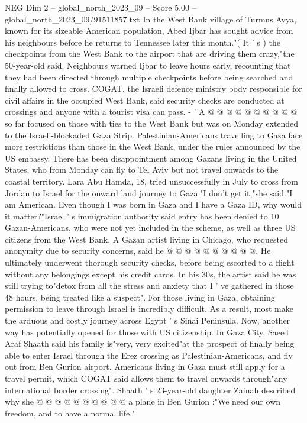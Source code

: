 \begin{textsample}{NEG Dim 2 – global\_north\_2023\_09 – Score 5.00 – global\_north\_2023\_09/91511857.txt}
In the West Bank village of Turmus Ayya, known for its sizeable American population, Abed Ijbar has sought advice from his neighbours before he returns to Tennessee later this month."( It ' s ) the checkpoints from the West Bank to the airport that are driving them crazy,"the 50-year-old said.
Neighbours warned Ijbar to leave hours early, recounting that they had been directed through multiple checkpoints before being searched and finally allowed to cross.
COGAT, the Israeli defence ministry body responsible for civil affairs in the occupied West Bank, said security checks are conducted at crossings and anyone with a tourist visa can pass. - ' A @ @ @ @ @ @ @ @ @ @ so far focused on those with ties to the West Bank but was on Monday extended to the Israeli-blockaded Gaza Strip.
Palestinian-Americans travelling to Gaza face more restrictions than those in the West Bank, under the rules announced by the US embassy.
There has been disappointment among Gazans living in the United States, who from Monday can fly to Tel Aviv but not travel onwards to the coastal territory.
Lara Abu Hamda, 18, tried unsuccessfully in July to cross from Jordan to Israel for the onward land journey to Gaza."I don't get it,"she said."I am American.
Even though I was born in Gaza and I have a Gaza ID, why would it matter?"Israel ' s immigration authority said entry has been denied to 10 Gazan-Americans, who were not yet included in the scheme, as well as three US citizens from the West Bank.
A Gazan artist living in Chicago, who requested anonymity due to security concerns, said he @ @ @ @ @ @ @ @ @ @.
He ultimately underwent thorough security checks, before being escorted to a flight without any belongings except his credit cards.
In his 30s, the artist said he was still trying to"detox from all the stress and anxiety that I ' ve gathered in those 48 hours, being treated like a suspect".
For those living in Gaza, obtaining permission to leave through Israel is incredibly difficult.
As a result, most make the arduous and costly journey across Egypt ' s Sinai Peninsula.
Now, another way has potentially opened for those with US citizenship.
In Gaza City, Saeed Araf Shaath said his family is"very, very excited"at the prospect of finally being able to enter Israel through the Erez crossing as Palestinian-Americans, and fly out from Ben Gurion airport.
Americans living in Gaza must still apply for a travel permit, which COGAT said allows them to travel onwards through"any international border crossing".
Shaath ' s 23-year-old daughter Zainah described why she @ @ @ @ @ @ @ @ @ @ a plane in Ben Gurion :"We need our own freedom, and to have a normal life."

\end{textsample}

